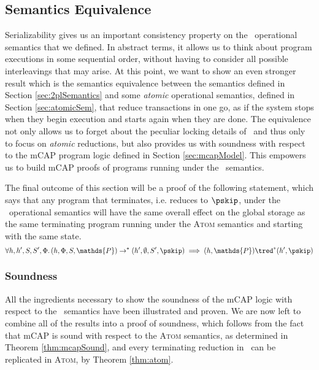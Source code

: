 \subsection{Semantics Equivalence}

Serializability gives us an important consistency property on the \tpl\ operational semantics that we defined. In abstract terms, it allows us to think about program executions in some sequential order, without having to consider all possible interleavings that may arise. At this point, we want to show an even stronger result which is the semantics equivalence between the semantics defined in Section \ref{sec:2plSemantics} and some \textit{atomic} operational semantics, defined in Section \ref{sec:atomicSem}, that reduce transactions in one go, as if the system stops when they begin execution and starts again when they are done. The equivalence not only allows us to forget about the peculiar locking details of \tpl\ and thus only to focus on \textit{atomic} reductions, but also provides us with soundness with respect to the mCAP program logic defined in Section \ref{sec:mcapModel}. This empowers us to build mCAP proofs of programs running under the \tpl\ semantics.

The final outcome of this section will be a proof of the following statement, which says that any program that terminates, i.e. reduces to $\pskip$, under the \tpl\ operational semantics will have the same overall effect on the global storage as the same terminating program running under the \textsc{Atom} semantics and starting with the same state.
\[
	\forall h, h', S, S', \Phi \ldotp
	(h, \Phi, S, \mathds{P}) \rightarrow^* (h', \emptyset, S', \pskip) \implies 
	(h, \mathds{P}) \tred^* (h', \pskip)
\]

%

%



%

\iffalse
\subsubsection{Soundness}

All the ingredients necessary to show the soundness of the mCAP logic with respect to the \tpl\ semantics have been illustrated and proven. We are now left to combine all of the results into a proof of soundness, which follows from the fact that mCAP is sound with respect to the \textsc{Atom} semantics, as determined in Theorem \ref{thm:mcapSound}, and every terminating reduction in \tpl\ can be replicated in \textsc{Atom}, by Theorem \ref{thm:atom}.

